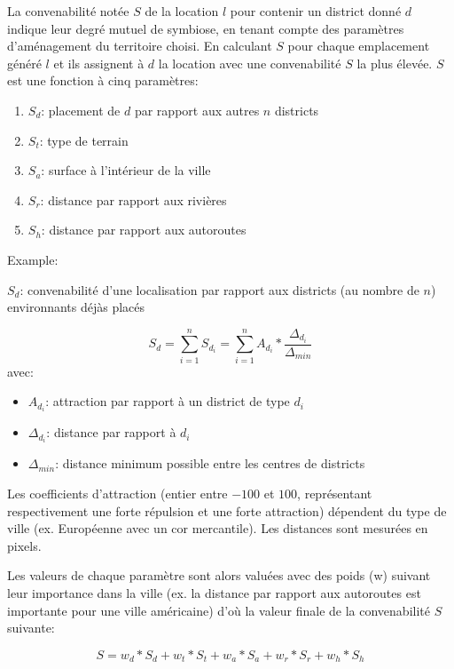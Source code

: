 \documentclass[11pt]{article}
\begin{document}
La convenabilité notée $S$ de la location $l$ pour contenir un district donné $d$ indique leur degré mutuel de symbiose, en tenant compte des paramètres d'aménagement du territoire choisi. En calculant $S$ pour chaque emplacement généré $l$ et ils assignent à $d$ la location avec une convenabilité $S$ la plus élevée.
$S$ est une fonction à cinq paramètres:
\begin{enumerate}
\item $S_d$: placement de $d$ par rapport aux autres $n$ districts
\item $S_t$: type de terrain
\item $S_a$: surface à l'intérieur de la ville
\item $S_r$: distance par rapport aux rivières
\item $S_h$: distance par rapport aux autoroutes\newline
\end{enumerate}

Example: 

$S_d$: convenabilité d'une localisation par rapport aux districts (au nombre de $n$) environnants déjàs placés

\begin{equation}
S_d = \sum_{i=1}^n S_{d_i} = \sum_{i=1}^n A_{d_i}  \ast \frac{\Delta_{d_i}}{\Delta_{min}}
\end{equation}
avec:\newline
\begin{itemize}
\item $A_{d_i}$: attraction par rapport à un district de type $d_i$
\item $\Delta_{d_i}$: distance par rapport à $d_i$
\item $\Delta_{min}$: distance minimum possible entre les centres de districts\newline
\end{itemize}

Les coefficients d'attraction (entier entre $-100$ et $100$, représentant respectivement une forte répulsion et une forte attraction) dépendent du type de ville (ex. Européenne avec un cor mercantile).
Les distances sont mesurées en pixels.

Les valeurs de chaque paramètre sont alors valuées avec des poids (w) suivant leur importance dans la ville (ex. la distance par rapport aux autoroutes est importante pour une ville américaine) d'où la valeur finale de la convenabilité $S$ suivante:

\begin{equation}
S = w_d \ast S_d + w_t \ast S_t + w_a \ast S_a + w_r \ast S_r + w_h \ast S_h
\end{equation}
\end{document}

